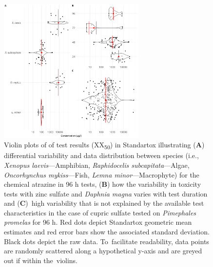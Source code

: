 \documentclass[data,datadescriptor,accept,moreauthors,pdftex]{Definitions/mdpi}
\begin{document}
\begin{figure}[H]
    \centering
    \includegraphics[width=0.65\textwidth]{figures/results_variability.png}
    \caption{Violin plots of of test results (XX\textsubscript{50}) in Standartox illustrating (\textbf{A}) differential variability and data distribution between species (i.e., \textit{Xenopus laevis}---Amphibian, \textit{Raphidocelis subcapitata}---Algae, \textit{Oncorhynchus mykiss}---Fish, \textit{Lemna minor}---Macrophyte) for the chemical atrazine in 96 h tests, (\textbf{B}) how the variability in toxicity tests with zinc sulfate and \textit{Daphnia magna} varies with test duration and (\textbf{C})~high variability that is not explained by the available test characteristics in the case of cupric sulfate tested on \textit{Pimephales promelas} for 96 h. Red dots depict Standartox geometric mean estimates and red error bars show the associated standard deviation. Black dots depict the raw data. To~facilitate readability, data points are randomly scattered along a hypothetical y-axis and are greyed out if within the~violins.}
    \label{fig:stx-variability}
\end{figure}
\unskip
\end{document}
